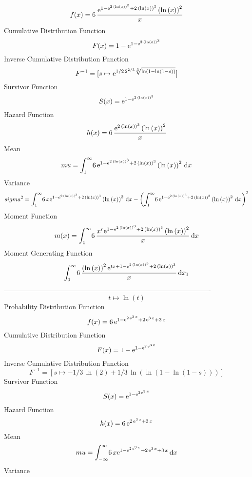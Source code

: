 \documentclass[12pt]{article}
\begin{document}
$$  f(x)=6\,{\frac {{{\rm e}^{1-{{\rm e}^{2\, \left( \ln  \left( x \right) 
 \right) ^{3}}}+2\, \left( \ln  \left( x \right)  \right) ^{3}}}
 \left( \ln  \left( x \right)  \right) ^{2}}{x}}
$$Cumulative Distribution Function  
 $$F(x)=1-{{\rm e}^{1-{{\rm e}^{2\, \left( \ln  \left( x \right)  \right) ^{3}
}}}}
$$ Inverse Cumulative Distribution Function 
  $$F^{-1} = [s\mapsto {{\rm e}^{1/2\,{2}^{2/3}\sqrt [3]{\ln  \left( 1-\ln  \left( 
1-s \right)  \right) }}}]
$$Survivor Function 
 $$ S(x)={{\rm e}^{1-{{\rm e}^{2\, \left( \ln  \left( x \right)  \right) ^{3}}}
}}
$$ Hazard Function 
 $$ h(x)=6\,{\frac {{{\rm e}^{2\, \left( \ln  \left( x \right)  \right) ^{3}}}
 \left( \ln  \left( x \right)  \right) ^{2}}{x}}
$$Mean 
 $$ mu=\int_{1}^{\infty }\!6\,{{\rm e}^{1-{{\rm e}^{2\, \left( \ln  \left( x
 \right)  \right) ^{3}}}+2\, \left( \ln  \left( x \right)  \right) ^{3
}}} \left( \ln  \left( x \right)  \right) ^{2}\,{\rm d}x
$$ Variance 
 $$ sigma^2 = \int_{1}^{\infty }\!6\,x{{\rm e}^{1-{{\rm e}^{2\, \left( \ln  \left( x
 \right)  \right) ^{3}}}+2\, \left( \ln  \left( x \right)  \right) ^{3
}}} \left( \ln  \left( x \right)  \right) ^{2}\,{\rm d}x- \left( \int_
{1}^{\infty }\!6\,{{\rm e}^{1-{{\rm e}^{2\, \left( \ln  \left( x
 \right)  \right) ^{3}}}+2\, \left( \ln  \left( x \right)  \right) ^{3
}}} \left( \ln  \left( x \right)  \right) ^{2}\,{\rm d}x \right) ^{2}
$$Moment Function 
 $$ m(x) = \int_{1}^{\infty }\!6\,{\frac {{x}^{r}{{\rm e}^{1-{{\rm e}^{2\,
 \left( \ln  \left( x \right)  \right) ^{3}}}+2\, \left( \ln  \left( x
 \right)  \right) ^{3}}} \left( \ln  \left( x \right)  \right) ^{2}}{x
}}\,{\rm d}x
$$ Moment Generating Function 
 $$\int_{1}^{\infty }\!6\,{\frac { \left( \ln  \left( x \right)  \right) 
^{2}{{\rm e}^{tx+1-{{\rm e}^{2\, \left( \ln  \left( x \right) 
 \right) ^{3}}}+2\, \left( \ln  \left( x \right)  \right) ^{3}}}}{x}}
\,{\rm d}x_{{1}}
$$-------------------------------------------------------------------------------------------  \\$$t\mapsto \ln  \left( t \right) 
$$Probability Distribution Function 
$$  f(x)=6\,{{\rm e}^{1-{{\rm e}^{2\,{{\rm e}^{3\,x}}}}+2\,{{\rm e}^{3\,x}}+3\,
x}}
$$Cumulative Distribution Function  
 $$F(x)=1-{{\rm e}^{1-{{\rm e}^{2\,{{\rm e}^{3\,x}}}}}}
$$ Inverse Cumulative Distribution Function 
  $$F^{-1} = [s\mapsto -1/3\,\ln  \left( 2 \right) +1/3\,\ln  \left( \ln  \left( 1-
\ln  \left( 1-s \right)  \right)  \right) ]
$$Survivor Function 
 $$ S(x)={{\rm e}^{1-{{\rm e}^{2\,{{\rm e}^{3\,x}}}}}}
$$ Hazard Function 
 $$ h(x)=6\,{{\rm e}^{2\,{{\rm e}^{3\,x}}+3\,x}}
$$Mean 
 $$ mu=\int_{-\infty }^{\infty }\!6\,x{{\rm e}^{1-{{\rm e}^{2\,{{\rm e}^{3\,x
}}}}+2\,{{\rm e}^{3\,x}}+3\,x}}\,{\rm d}x
$$ Variance 
\end{document}
